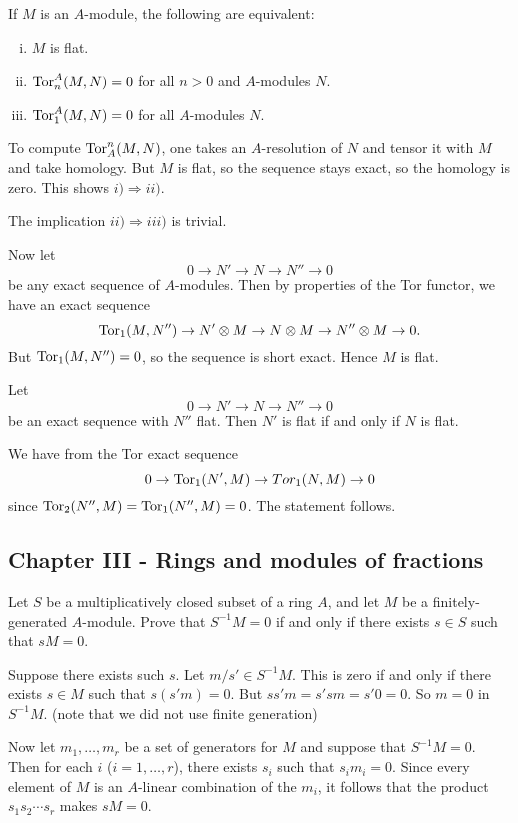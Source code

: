 \documentclass[11pt, english]{article}
\begin{document}
\begin{exc}[Exercise 24]
If $M$ is an $A$-module, the following are equivalent:
  \begin{enumerate}[i)]
  \item $M$ is flat.
\item $\operatorname{\mathrm{Tor}}_n^A(M,N)=0$ for all $n>0$ and $A$-modules $N$.
\item $\operatorname{\mathrm{Tor}}_1^A(M,N)=0$ for all $A$-modules $N$.
  \end{enumerate}
  \begin{sol}

To compute $\operatorname{\mathrm{Tor}}_A^n(M,N)$, one takes an $A$-resolution of $N$ and tensor it with $M$ and take homology. But $M$ is flat, so the sequence stays exact, so the homology is zero. This shows $i) \Rightarrow ii)$.

The implication $ii) \Rightarrow iii)$ is trivial.

Now let
\[
0 \to N' \to N \to N'' \to 0
\]
be any exact sequence of $A$-modules. Then by properties of the Tor functor, we have an exact sequence
\[
\operatorname{\mathrm{Tor}}_1(M,N'') \to N' \otimes M \to N \otimes M \to N'' \otimes M \to 0.
\]
But $\operatorname{\mathrm{Tor}}_1(M,N'')=0$, so the sequence is short exact. Hence $M$ is flat.
  \end{sol}

  \begin{exc}[Exercise 25]

Let 
\[
0 \to N' \to N \to N'' \to 0
\]
be an exact sequence with $N''$ flat. Then $N'$ is flat if and only if $N$ is flat.
  \end{exc}
  \begin{sol}
    We have from the Tor exact sequence
\[
0 \to \operatorname{\mathrm{Tor}}_1(N',M) \to Tor_1(N,M) \to 0
\]
since $\operatorname{\mathrm{Tor}}_2(N'',M)=\operatorname{\mathrm{Tor}}_1(N'',M)=0$. The statement follows.
  \end{sol}
  
\end{exc}

\subsection{Chapter III - Rings and modules of fractions}
\begin{exc}[Exercise 1]

Let $S$ be a multiplicatively closed subset of a ring $A$, and let $M$ be a finitely-generated $A$-module. Prove that $S^{-1}M=0$ if and only if there exists $s \in S$ such that $sM=0$.  
\end{exc}

\begin{sol}
 Suppose there exists such $s$. Let $m/s' \in S^{-1}M$. This is zero if and only if there exists $s \in M$ such that $s(s'm)=0$. But $ss'm=s'sm=s'0=0$. So $m=0$ in $S^{-1}M$.  (note that we did not use finite generation)

Now let $m_1,\ldots,m_r$ be a set of generators for $M$ and suppose that $S^{-1}M=0$. Then for each $i$ ($i=1,\ldots,r$), there exists $s_i$ such that $s_im_i=0$. Since every element of $M$ is an $A$-linear combination of the $m_i$, it follows that the product $s_1s_2\cdots s_r$ makes $sM=0$.
\end{sol}
\end{document}
